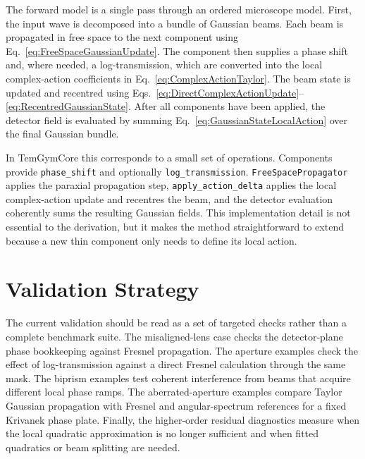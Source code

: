 \documentclass{article}
\begin{document}
The forward model is a single pass through an ordered microscope model. 
First, the input wave is decomposed into a bundle of Gaussian beams. 
Each beam is propagated in free space to the next component using Eq.~\eqref{eq:FreeSpaceGaussianUpdate}. 
The component then supplies a phase shift and, where needed, a log-transmission, which are converted into the local complex-action coefficients in Eq.~\eqref{eq:ComplexActionTaylor}. 
The beam state is updated and recentred using Eqs.~\eqref{eq:DirectComplexActionUpdate}--\eqref{eq:RecentredGaussianState}. 
After all components have been applied, the detector field is evaluated by summing Eq.~\eqref{eq:GaussianStateLocalAction} over the final Gaussian bundle.

In TemGymCore this corresponds to a small set of operations. 
Components provide \texttt{phase\_shift} and optionally \texttt{log\_transmission}. 
\texttt{FreeSpacePropagator} applies the paraxial propagation step, \texttt{apply\_action\_delta} applies the local complex-action update and recentres the beam, and the detector evaluation coherently sums the resulting Gaussian fields. 
This implementation detail is not essential to the derivation, but it makes the method straightforward to extend because a new thin component only needs to define its local action.

\section{Validation Strategy}

The current validation should be read as a set of targeted checks rather than a complete benchmark suite. 
The misaligned-lens case checks the detector-plane phase bookkeeping against Fresnel propagation. 
The aperture examples check the effect of log-transmission against a direct Fresnel calculation through the same mask. 
The biprism examples test coherent interference from beams that acquire different local phase ramps. 
The aberrated-aperture examples compare Taylor Gaussian propagation with Fresnel and angular-spectrum references for a fixed Krivanek phase plate. 
Finally, the higher-order residual diagnostics measure when the local quadratic approximation is no longer sufficient and when fitted quadratics or beam splitting are needed.



\end{document}
